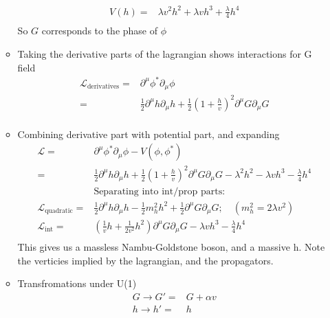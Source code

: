 \begin{itemize}
\begin{itemize}
\begin{equation}
\begin{split}
        V(h)=&\lambda v^2h^2+\lambda vh^3+\frac{\lambda}{4}h^4 \\
        \end{split}\end{equation}
        So $G$ corresponds to the phase of $\phi$
        \item Taking the derivative parts of the lagrangian shows interactions for G field \cite{wells}
        \begin{equation}\begin{split}
        \mathcal{L}_\text{derivatives}=&\partial^\mu\phi^*\partial_\mu\phi\\
        =&\frac{1}{2}\partial^\mu h\partial_\mu h+\frac{1}{2}(1+\frac{h}{v})^2\partial^\mu G\partial_\mu G \\
        \end{split}\end{equation}
        \item Combining derivative part with potential part, and expanding \cite{wells}
        \begin{equation}\begin{split}
        \mathcal{L}=&\partial^\mu\phi^*\partial_\mu\phi-V(\phi,\phi^*) \\
        =&\frac{1}{2}\partial^\mu h\partial_\mu h+\frac{1}{2}(1+\frac{h}{v})^2 \partial^\mu G\partial_\mu G -\lambda^2h^2-\lambda vh^3-\frac{\lambda}{4}h^4 \\
        &\text{Separating into int/prop parts:} \\
        \mathcal{L}_\text{quadratic}=&\frac{1}{2}\partial^\mu h\partial_\mu h-\frac{1}{2}m_h^2h^2+\frac{1}{2}\partial^\mu G\partial_\mu G; \quad(m_h^2=2\lambda v^2)\\
        \mathcal{L}_\text{int}=&(\frac{1}{v}h+\frac{1}{2v^2}h^2)\partial^\mu G\partial_\mu G-\lambda vh^3-\frac{\lambda}{4}h^4 \\
        \end{split}\end{equation}
        This gives us a massless Nambu-Goldstone boson, and a massive h. Note the verticies implied by the lagrangian, and the propagators.
        \item Transfromations under U(1) \cite{wells}
        \begin{equation}\begin{split}
        G\to G'=&G+\alpha v \\
        h\to h'=&h \\
        \end{split}\end{equation}

\end{itemize}
\end{itemize}
